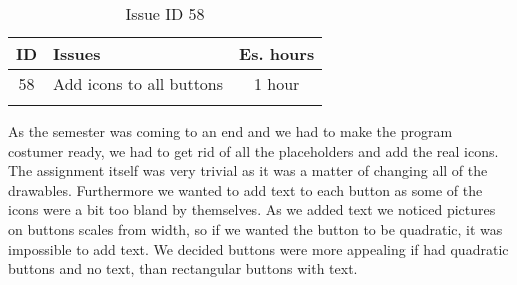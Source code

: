 \begin{longtable} { | c | p{12cm} | c | } 
\hline
	ID 	&	Issues	&		 Es. hours \\\hline
	58	&	Add icons to all buttons	&	1 hour	\\\hline
\caption{Issue ID 58}
\label{tab:spr4_iconstobuttons}
\end{longtable}

As the semester was coming to an end and we had to make the program costumer ready, we had to get rid of all the placeholders and add the real icons. The assignment itself was very trivial as it was a matter of changing all of the drawables. Furthermore we wanted to add text to each button as some of the icons were a bit too bland by themselves. As we added text we noticed pictures on buttons scales from width, so if we wanted the button to be quadratic, it was impossible to add text. We decided buttons were more appealing if had quadratic buttons and no text, than rectangular buttons with text.